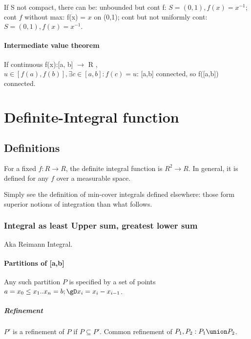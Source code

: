 \documentclass[oneside, article]{memoir}
\begin{document}

If S not compact, there can be: unbounded but cont f: $S = (0,1), f(x) = x^{-1}$; cont $f$ without max: f(x) = $x$ on (0,1); cont but not uniformly cont: $S = (0,1), f(x) = x^{-1}$.

\subsubsection{Intermediate value theorem}
If continuous f(x):[a, b] $\to$ R , \\
$u \in [f(a), f(b)], \exists c \in [a, b] : f(c) = u$: [a,b] connected, so f([a,b]) connected.

\chapter{Definite-Integral function}
\section{Definitions}
For a fixed $f:R \to R$, the definite integral function is $R^{2} \to R$. In general, it is defined for any $f$ over a measurable space.

Simply see the definition of min-cover integrals defined elsewhere: those form superior notions of integration than what follows.

\subsection{Integral as least Upper sum, greatest lower sum}
Aka Reimann Integral.

\subsubsection{Partitions of [a,b]}
Any such partition $P$ is specified by a set of points $a = x_{0} \leq x_{1} .. x_{n} = b; \gD x_{i} = x_{i}- x_{i-1}$.

\paragraph{Refinement}
$P'$ is a refinement of $P$ if $P \subseteq P'$. Common refinement of $P_{1}, P_{2}: P_{1} \union P_{2}$.
\end{document}
